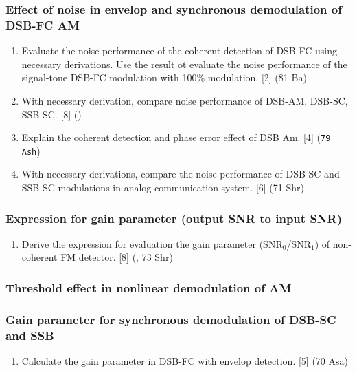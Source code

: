 \documentclass[12pt]{article}
\begin{document}
    \subsubsection{Effect of noise in envelop and synchronous demodulation of DSB-FC AM}
    	\begin{enumerate}
    		\item  Evaluate the noise performance of the coherent detection of DSB-FC using necessary derivations. Use the result ot evaluate the noise performance of the signal-tone DSB-FC modulation with 100\% modulation. \hfill [2] (81 Ba)
    		
    		\item With necessary derivation, compare noise performance of DSB-AM, DSB-SC, SSB-SC. \hfill [8] ()

        \item Explain the coherent detection and phase error effect of DSB Am. \hfill [4] (\texttt{79 Ash})
    		
    		\item With necessary derivations, compare the noise performance of DSB-SC and SSB-SC modulations in analog communication system. \hfill [6] (71 Shr)
    	\end{enumerate}
    	
    \subsubsection{Expression for gain parameter (output SNR to input SNR)}
    	\begin{enumerate}
    		\item Derive the expression for evaluation the gain parameter (SNR$_0$/SNR$_1$) of non-coherent FM detector. \hfill [8] (, 73 Shr)
    	\end{enumerate}
    
    \subsubsection{Threshold effect in nonlinear demodulation of AM}
    \subsubsection{Gain parameter for synchronous demodulation of DSB-SC and SSB}
    	\begin{enumerate}
    		\item Calculate the gain parameter in DSB-FC with envelop detection. \hfill [5] (70 Asa)
    	\end{enumerate}
    
\end{document}
